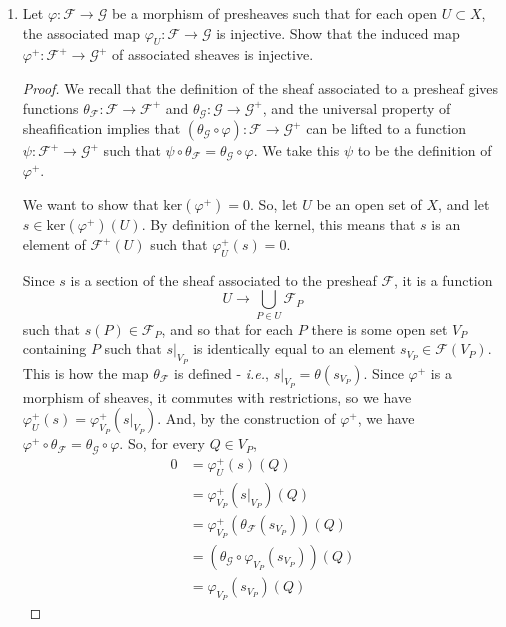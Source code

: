 \documentclass[12pt]{article}
\theoremstyle{definition}
\newenvironment{problem}[2][Problem]{\begin{trivlist}
\item[\hskip \labelsep {\bfseries #1}\hskip \labelsep {\bfseries #2.}]}{\end{trivlist}}
\begin{document}
\begin{problem}{4}
\begin{enumerate}[label=(\alph*)]
\item Let $\varphi: \mathcal F \to \mathcal G$ be a morphism of presheaves such that for each open $U \subset X$, the associated map $\varphi_U: \mathcal F \to \mathcal G$ is injective. Show that the induced map $\varphi^+: \mathcal F^+ \to \mathcal G^+$ of associated sheaves is injective.
    \begin{proof}
        We recall that the definition of the sheaf associated to a presheaf gives functions $\theta_{\mathcal F}: \mathcal F \to \mathcal F^+$ and $\theta_{\mathcal G}: \mathcal G \to \mathcal G^+$, and the universal property of sheafification implies that $(\theta_{\mathcal G} \circ \varphi): \mathcal F \to \mathcal G^+$ can be lifted to a function $\psi: \mathcal F^+ \to \mathcal G^+$ such that $\psi \circ \theta_{\mathcal F} = \theta_{\mathcal G} \circ \varphi$. We take this $\psi$ to be the definition of $\varphi^+$.
        \par We want to show that $\text{ker}(\varphi^+) = 0$. So, let $U$ be an open set of $X$, and let $s \in \text{ker}(\varphi^+)(U)$. By definition of the kernel, this means that $s$ is an element of $\mathcal F^+(U)$ such that $\varphi^+_U(s) = 0$. 
        \par Since $s$ is a section of the sheaf associated to the presheaf $\mathcal F$, it is a function
        \[
        U \to \bigcup_{P \in U} \mathcal F_P
        \]
	such that $s(P) \in \mathcal F_P$, and so that for each $P$ there is some open set $V_P$ containing $P$ such that $s\lvert_{V_P}$ is identically equal to an element $s_{V_P} \in \mathcal F(V_P)$. This is how the map $\theta_{\mathcal{F}}$ is defined - \textit{i.e.}, $s\lvert_{V_P} = \theta(s_{V_P})$. Since $\varphi^+$ is a morphism of sheaves, it commutes with restrictions, so we have $\varphi^+_U(s) = \varphi^+_{V_P}(s\lvert_{V_P})$. And, by the construction of $\varphi^+$, we have $\varphi^+ \circ \theta_{\mathcal{F}} = \theta_{\mathcal{G}} \circ \varphi$. So, for every $Q \in V_P $,
    \begin{align*}
	    0 &= \varphi^+_U(s)(Q)\\ &= \varphi^+_{V_P}(s\lvert_{V_P})(Q)\\
	    &= \varphi^+_{V_P}(\theta_{\mathcal{F}}(s_{V_P}))(Q)\\
	&= (\theta_{\mathcal{G}} \circ \varphi_{V_P}(s_{V_P}))(Q)\\
	&= \varphi_{V_P}(s_{V_P})(Q)
    \end{align*}

\end{proof}
\end{enumerate}
\end{problem}
\end{document}
